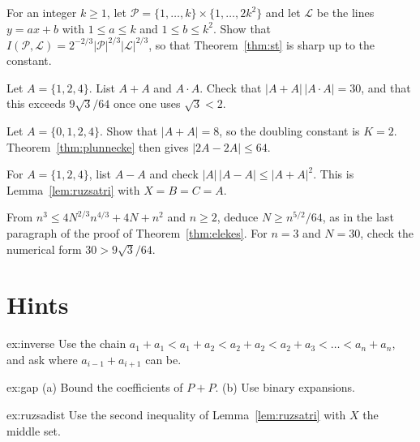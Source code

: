 \begin{exercise}[$\star\star\star$]\label{ex:stsharp}
For an integer $k\ge1$, let $\mathcal P=\{1,\dots,k\}\times\{1,\dots,2k^2\}$ and let $\mathcal L$ be the lines $y=ax+b$ with $1\le a\le k$ and $1\le b\le k^2$. Show that $I(\mathcal P,\mathcal L)=2^{-2/3}|\mathcal P|^{2/3}|\mathcal L|^{2/3}$, so that Theorem~\ref{thm:st} is sharp up to the constant.
\end{exercise}

\begin{exercise}[$\star$]\label{ex:v14-extra-11-1}
Let $A=\{1,2,4\}$. List $A+A$ and $A\cdot A$. Check that $|A+A|\,|A\cdot A|=30$, and that this exceeds $9\sqrt3/64$ once one uses $\sqrt3<2$.
\end{exercise}

\begin{exercise}[$\star$]\label{ex:v14-extra-11-2}
Let $A=\{0,1,2,4\}$. Show that $|A+A|=8$, so the doubling constant is $K=2$. Theorem~\ref{thm:plunnecke} then gives $|2A-2A|\le64$.
\end{exercise}

\begin{exercise}[$\star\star$]\label{ex:v14-extra-11-3}
For $A=\{1,2,4\}$, list $A-A$ and check $|A|\,|A-A|\le|A+A|^2$. This is Lemma~\ref{lem:ruzsatri} with $X=B=C=A$.
\end{exercise}

\begin{exercise}[$\star\star\star$]\label{ex:v14-extra-11-4}
From $n^3\le4N^{2/3}n^{4/3}+4N+n^2$ and $n\ge2$, deduce $N\ge n^{5/2}/64$, as in the last paragraph of the proof of Theorem~\ref{thm:elekes}. For $n=3$ and $N=30$, check the numerical form $30>9\sqrt3/64$.
\end{exercise}

\section{Hints}

\begin{hint}{ex:inverse}
Use the chain $a_1+a_1<a_1+a_2<a_2+a_2<a_2+a_3<\dots<a_n+a_n$, and ask where $a_{i-1}+a_{i+1}$ can be.
\end{hint}

\begin{hint}{ex:gap}
(a) Bound the coefficients of $P+P$. (b) Use binary expansions.
\end{hint}

\begin{hint}{ex:ruzsadist}
Use the second inequality of Lemma~\ref{lem:ruzsatri} with $X$ the middle set.
\end{hint}

